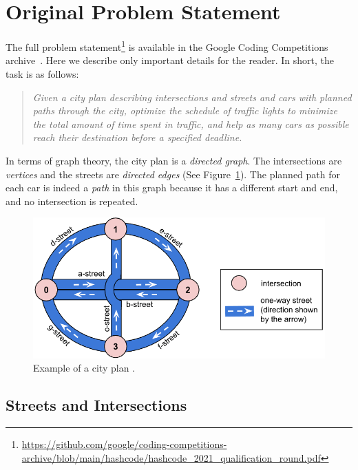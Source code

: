 \section{Original Problem Statement} \label{sec:original_problem_statement}

The full problem statement\footnote{\url{https://github.com/google/coding-competitions-archive/blob/main/hashcode/hashcode_2021_qualification_round.pdf}} is available in the Google Coding Competitions archive~\cite{google2023google}. Here we describe only important details for the reader.
In short, the task is as follows:
\begin{quote}
    \textit{Given a city plan describing intersections and streets and cars with planned paths through the city, optimize the schedule of traffic lights to minimize the total amount of time spent in traffic, and help as many cars as possible reach their destination before a specified deadline.}
\end{quote}
In terms of graph theory, the city plan is a \textit{directed graph}. The intersections are \textit{vertices} and the streets are \textit{directed edges} (See Figure~\ref{fig:hashcode_city_plan}). The planned path for each car is indeed a \textit{path} in this graph because it has a different start and end, and no intersection is repeated.

\begin{figure}
    \centering
    \includegraphics[width=\linewidth]{img/hashcode/figure1.png}
    \caption[Example of a city plan]{
        Example of a city plan \cite{google2023google}.
    }
    \label{fig:hashcode_city_plan}
\end{figure}

\subsection{Streets and Intersections}

